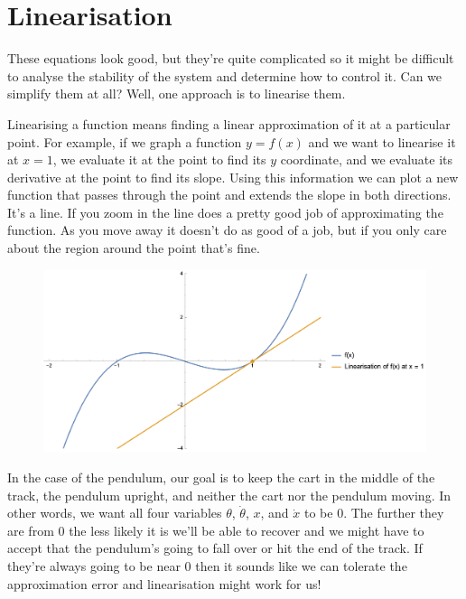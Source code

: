\documentclass{article}
\begin{document}
\section{Linearisation}

These equations look good, but they're quite complicated so it might be difficult to analyse the stability of the system and determine how to control it. Can we simplify them at all? Well, one approach is to linearise them.

Linearising a function means finding a linear approximation of it at a particular point. For example, if we graph a function $y = f(x)$ and we want to linearise it at $x = 1$, we evaluate it at the point to find its $y$ coordinate, and we evaluate its derivative at the point to find its slope. Using this information we can plot a new function that passes through the point and extends the slope in both directions. It's a line. If you zoom in the line does a pretty good job of approximating the function. As you move away it doesn't do as good of a job, but if you only care about the region around the point that's fine.

\begin{figure}[H]
  \centering
\includegraphics[width=\textwidth]{linearisation}
\end{figure}

In the case of the pendulum, our goal is to keep the cart in the middle of the track, the pendulum upright, and neither the cart nor the pendulum moving. In other words, we want all four variables $\theta$, $\dot{\theta}$, $x$, and $\dot{x}$ to be $0$. The further they are from $0$ the less likely it is we'll be able to recover and we might have to accept that the pendulum's going to fall over or hit the end of the track. If they're always going to be near $0$ then it sounds like we can tolerate the approximation error and linearisation might work for us!
\end{document}
